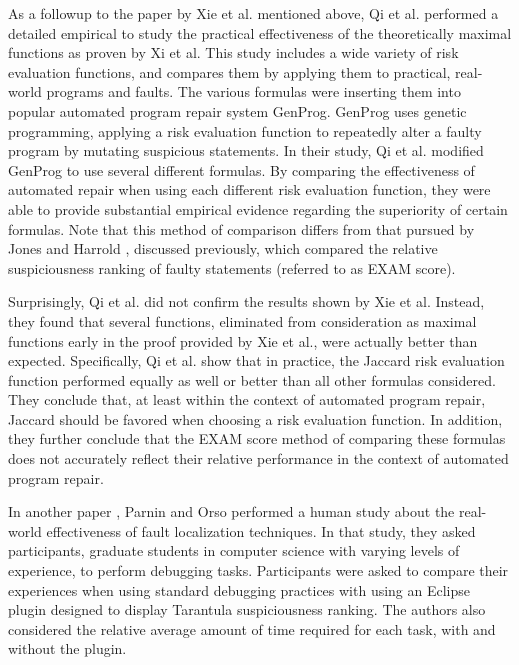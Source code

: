 \documentclass[11pt]{article}
\begin{document}
As a followup to the paper by Xie et al. mentioned above, Qi et al. \hspace*{-0.7mm}\cite{genprog}
performed a detailed empirical to study the practical effectiveness of the 
theoretically maximal functions as proven by Xi et al.  This study includes
a wide variety of risk evaluation functions, and compares them by applying 
them to practical, real-world programs and faults.  The various formulas
were inserting them into popular automated program repair system GenProg.
GenProg uses genetic programming, applying a risk evaluation function to 
repeatedly alter a faulty program by mutating suspicious statements.  In their
study, Qi et al. \hspace*{-0.5mm}modified GenProg to use several different formulas.  By 
comparing the effectiveness of automated repair when using each different 
risk evaluation function, they were able to provide substantial empirical
evidence regarding the superiority of certain formulas.  Note that this method
of comparison differs from that pursued by Jones and Harrold \cite{harrold}, 
discussed previously, which compared the relative suspiciousness ranking of 
faulty statements (referred to as EXAM score).

Surprisingly, Qi et al. did not confirm the results shown by Xie et al.
Instead, they found that several functions, eliminated from consideration
as maximal functions early in the proof provided by Xie et al., were actually better than expected. Specifically,
Qi et al. show that in practice, the Jaccard risk evaluation function performed
equally as well or better than all other formulas considered.  They conclude that,
at least within the context of automated program repair, Jaccard should be 
favored when choosing a risk evaluation function.  In addition, they further 
conclude that the EXAM score method of comparing these formulas does not 
accurately reflect their relative performance in the context of automated
program repair.

In another paper \cite{parnin}, Parnin and Orso performed a human study about the
real-world effectiveness of fault localization techniques.  In that
study, they asked participants, graduate students in computer science
with varying levels of experience, to perform debugging tasks.
Participants were asked to compare their experiences when using standard
debugging practices with using an Eclipse plugin designed to display
Tarantula suspiciousness ranking.  The authors also considered the
relative average amount of time required for each task, with and without
the plugin.  
\end{document}
